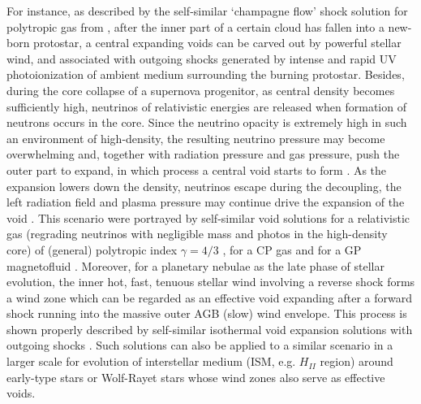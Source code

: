 \documentclass[fleqn,usenatbib]{mnras}
\begin{document}
For instance, as described by the self-similar `champagne flow' shock solution for polytropic gas from \citet{hu2008self}, after the inner part of a certain cloud has fallen into a new-born protostar, a central expanding voids can be carved out by powerful stellar wind, and associated with outgoing shocks generated by intense and rapid UV photoionization of ambient medium surrounding the burning protostar. Besides, during the core collapse of a supernova progenitor, as central density becomes sufficiently high, neutrinos of relativistic energies are released when formation of neutrons occurs in the core. Since the neutrino opacity is extremely high in such an environment of high-density, the resulting neutrino pressure may become overwhelming and, together with radiation pressure and gas pressure, push the outer part to expand, in which process a central void starts to form \citep{lou2008self}. As the expansion lowers down the density, neutrinos escape during the decoupling, the left radiation field and plasma pressure may continue drive the expansion of the void \citep{lou2012dynamic}. This scenario were portrayed by self-similar void solutions for a relativistic gas (regrading neutrinos with negligible mass and photos in the high-density core) of (general) polytropic index $\gamma=4/3$ \citep{lou2008self}, for a CP gas \citep{lou2012dynamic} and for a GP magnetofluid \citep{lou2010general}. Moreover, for a planetary nebulae as the late phase of stellar evolution, the inner hot, fast, tenuous stellar wind involving a reverse shock forms a wind zone which can be regarded as an effective void expanding after a forward shock running into the massive outer AGB (slow) wind envelope. This process is shown properly described by self-similar isothermal void expansion solutions with outgoing shocks \citep{lou2009dynamic}. Such solutions can also be applied to a similar scenario in a larger scale for evolution of interstellar medium (ISM, e.g. $H_{II}$ region) around early-type stars or Wolf-Rayet stars whose wind zones also serve as effective voids.
\end{document}

